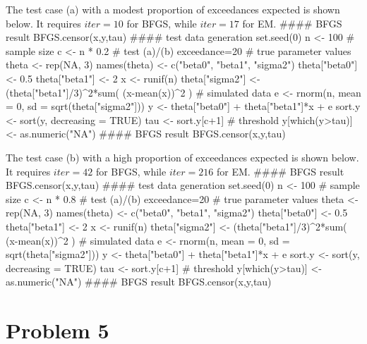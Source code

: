 \documentclass{article}
\begin{document}
The test case (a) with a modest proportion of exceedances expected is shown below. It requires $iter=10$ for BFGS, while $iter=17$ for EM.
#### BFGS result
BFGS.censor(x,y,tau)
\newpage
#### test data generation
set.seed(0)
n <- 100 # sample size
c <- n * 0.2 # test (a)/(b) exceedance=20%
# true parameter values
theta <- rep(NA, 3)
names(theta) <- c("beta0", "beta1", "sigma2")
theta["beta0"]  <- 0.5
theta["beta1"]  <- 2
x <- runif(n)
theta["sigma2"] <- (theta["beta1"]/3)^2*sum( (x-mean(x))^2 )
# simulated data
e <- rnorm(n, mean = 0, sd = sqrt(theta["sigma2"]))
y <- theta["beta0"] + theta["beta1"]*x + e
sort.y <- sort(y, decreasing = TRUE)
tau <- sort.y[c+1] # threshold
y[which(y>tau)] <- as.numeric("NA")
#### BFGS result
BFGS.censor(x,y,tau)



The test case (b) with a high proportion of exceedances expected is shown below. It requires $iter=42$ for BFGS, while $iter=216$ for EM.
#### BFGS result
BFGS.censor(x,y,tau)
#### test data generation
set.seed(0)
n <- 100 # sample size
c <- n * 0.8 # test (a)/(b) exceedance=20%
# true parameter values
theta <- rep(NA, 3)
names(theta) <- c("beta0", "beta1", "sigma2")
theta["beta0"]  <- 0.5
theta["beta1"]  <- 2
x <- runif(n)
theta["sigma2"] <- (theta["beta1"]/3)^2*sum( (x-mean(x))^2 )
# simulated data
e <- rnorm(n, mean = 0, sd = sqrt(theta["sigma2"]))
y <- theta["beta0"] + theta["beta1"]*x + e
sort.y <- sort(y, decreasing = TRUE)
tau <- sort.y[c+1] # threshold
y[which(y>tau)] <- as.numeric("NA")
#### BFGS result
BFGS.censor(x,y,tau)








\newpage
\section*{Problem 5}
\end{document}
